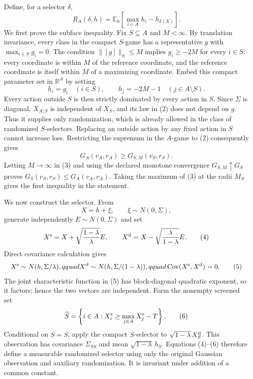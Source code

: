 Define, for a selector \(\delta\),
\[
R_A(\delta,h)=\mathbb E_h\!\left[\max_{i\in A}h_i-h_{\delta(X)}\right]. \tag{1}
\]
We first prove the subface inequality.  Fix \(S\subseteq A\) and \(M<\infty\).  By translation invariance, every class in the compact \(S\)-game has a representative \(g\) with \(\max_{i\in S}g_i=0\).  The condition \(\lVert[g]\rVert_S\leq M\) implies \(g_i\geq-2M\) for every \(i\in S\): every coordinate is within \(M\) of the reference coordinate, and the reference coordinate is itself within \(M\) of a maximizing coordinate.  Embed this compact parameter set in \(\mathbb R^A\) by setting
\[
h_i=g_i\quad(i\in S),
\qquad h_j=-2M-1\quad(j\in A\setminus S). \tag{2}
\]
Every action outside \(S\) is then strictly dominated by every action in \(S\).  Since \(\Sigma\) is diagonal, \(X_{A\setminus S}\) is independent of \(X_S\), and its law in (2) does not depend on \(g\).  Thus it supplies only randomization, which is already allowed in the class of randomized \(S\)-selectors.  Replacing an outside action by any fixed action in \(S\) cannot increase loss.  Restricting the supremum in the \(A\)-game to (2) consequently gives
\[
G_A(v_A,r_A)\geq G_{S,M}(v_S,r_S). \tag{3}
\]
Letting \(M\to\infty\) in (3) and using the declared monotone convergence \(G_{S,M}\uparrow G_S\) proves \(G_S(v_S,r_S)\leq G_A(v_A,r_A)\).  Taking the maximum of (3) at the radii \(M_S\) gives the first inequality in the statement.

We now construct the selector.  From
\[
X=h+\xi,\qquad \xi\sim N(0,\Sigma),
\]
generate independently \(E\sim N(0,\Sigma)\) and set
\[
X^{\rm s}=X+\sqrt{\frac{1-\lambda}{\lambda}}E,
\qquad
X^{\rm d}=X-\sqrt{\frac{\lambda}{1-\lambda}}E. \tag{4}
\]
Direct covariance calculation gives
\[
X^{\rm s}\sim N(h,\Sigma/\lambda),qquad
X^{\rm d}\sim N(h,\Sigma/(1-\lambda)),qquad
\operatorname{Cov}(X^{\rm s},X^{\rm d})=0. \tag{5}
\]
The joint characteristic function in (5) has block-diagonal quadratic exponent, so it factors; hence the two vectors are independent.  Form the nonempty screened set
\[
\widehat S=\left\{i\in A:X_i^{\rm s}\geq\max_{j\in A}X_j^{\rm s}-T\right\}. \tag{6}
\]
Conditional on \(\widehat S=S\), apply the compact \(S\)-selector to \(\sqrt{1-\lambda}\,X_S^{\rm d}\).  This observation has covariance \(\Sigma_{SS}\) and mean \(\sqrt{1-\lambda}\,h_S\).  Equations (4)--(6) therefore define a measurable randomized selector using only the original Gaussian observation and auxiliary randomization.  It is invariant under addition of a common constant.

